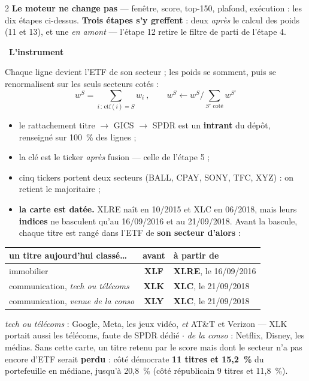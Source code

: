 \documentclass[9pt,a4paper]{extarticle}
\newcommand{\etape}[2]{\vspace{0.9mm}{\color{rouge}\bfseries #1.}~{\bfseries #2}\par\vspace{0.15mm}}
\newenvironment{pts}{\begin{itemize}[leftmargin=3.4mm,itemsep=0.2mm,topsep=0.4mm,parsep=0pt,label={\color{bleu}\footnotesize\textbullet}]}{\end{itemize}}
\begin{document}
\begin{multicols}{2}
\textbf{Le moteur ne change pas} --- fenêtre, score, top-150, plafond, exécution : les dix étapes ci-dessus.
\textbf{Trois étapes s'y greffent} : deux \emph{après} le calcul des poids (11 et 13), et une \emph{en
amont} --- l'étape 12 retire le filtre de parti de l'étape 4.\par
\vspace{0.3mm}
\etape{11}{L'instrument}
Chaque ligne devient l'ETF de son secteur ; les poids se somment, puis se renormalisent sur les seuls
secteurs cotés :
\[ w^{S} = \!\!\!\sum_{i\,:\,\mathrm{etf}(i)=S}\!\!\! w_i \ , \qquad
   w^{S} \leftarrow w^{S} \Big/ \textstyle\sum_{S' \text{ coté}} w^{S'} \]
\begin{pts}
\item le rattachement titre $\to$ GICS $\to$ SPDR est un \textbf{intrant} du dépôt, renseigné sur 100~\% des lignes ;
\item la clé est le ticker \emph{après} fusion --- celle de l'étape 5 ;
\item cinq tickers portent deux secteurs (BALL, CPAY, SONY, TFC, XYZ) : on retient le majoritaire ;
\item \textbf{la carte est datée.} XLRE naît en 10/2015 et XLC en 06/2018, mais leurs \textbf{indices} ne
      basculent qu'au 16/09/2016 et au 21/09/2018. Avant la bascule, chaque titre est rangé dans l'ETF de
      \textbf{son secteur d'alors} :
\end{pts}
\vspace{-0.6mm}
{\centering\scriptsize\setlength{\tabcolsep}{4pt}
\begin{tabular}{@{}l c l@{}}
\toprule
un titre aujourd'hui classé\dots & avant & à partir de \\
\midrule
immobilier & \textbf{XLF} & \textbf{XLRE}, le 16/09/2016 \\
communication, \emph{tech ou télécoms} & \textbf{XLK} & \textbf{XLC}, le 21/09/2018 \\
communication, \emph{venue de la conso} & \textbf{XLY} & \textbf{XLC}, le 21/09/2018 \\
\bottomrule
\end{tabular}\par}
\vspace{0.3mm}
{\scriptsize\color{grisf} \emph{tech ou télécoms} : Google, Meta, les jeux vidéo, \emph{et} AT\&T et Verizon
--- XLK portait aussi les télécoms, faute de SPDR dédié $\cdot$ \emph{de la conso} : Netflix, Disney, les
médias. Sans cette carte, un titre retenu par le score mais dont le secteur n'a pas encore d'ETF serait
\textbf{perdu} : côté démocrate \textbf{11 titres et 15,2~\%} du portefeuille en médiane, jusqu'à 20,8~\%
(côté républicain 9 titres et 11,8~\%).}\par


\end{multicols}
\end{document}
